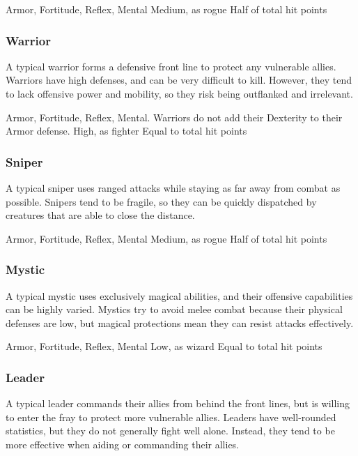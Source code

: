               Armor,  Fortitude,  Reflex,  Mental
             Medium, as rogue
             Half of total hit points

        \subsubsection{Warrior}
            A typical warrior forms a defensive front line to protect any vulnerable allies.
            Warriors have high defenses, and can be very difficult to kill.
            However, they tend to lack offensive power and mobility, so they risk being outflanked and irrelevant.

              Armor,  Fortitude,  Reflex,  Mental.
            Warriors do not add their Dexterity to their Armor defense.
             High, as fighter
             Equal to total hit points

        \subsubsection{Sniper}
            A typical sniper uses ranged attacks while staying as far away from combat as possible.
            Snipers tend to be fragile, so they can be quickly dispatched by creatures that are able to close the distance.

              Armor,  Fortitude,  Reflex,  Mental
             Medium, as rogue
             Half of total hit points

        \subsubsection{Mystic}
            A typical mystic uses exclusively magical abilities, and their offensive capabilities can be highly varied.
            Mystics try to avoid melee combat because their physical defenses are low, but magical protections mean they can resist attacks effectively.

              Armor,  Fortitude,  Reflex,  Mental
             Low, as wizard
             Equal to total hit points

        \subsubsection{Leader}
            A typical leader commands their allies from behind the front lines, but is willing to enter the fray to protect more vulnerable allies.
            Leaders have well-rounded statistics, but they do not generally fight well alone.
            Instead, they tend to be more effective when aiding or commanding their allies.

